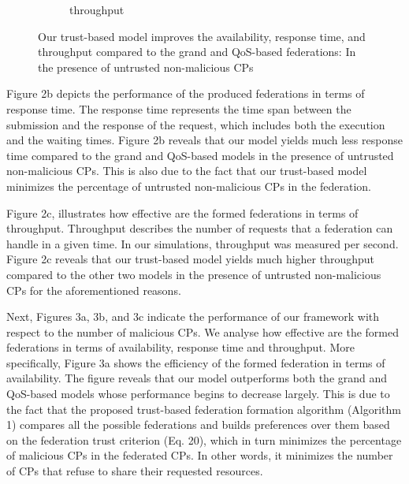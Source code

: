 \documentclass[preprint]{elsarticle}
\theoremstyle{definition}
\theoremstyle{remark}
\theoremstyle{property}
\begin{document}
\begin{figure}[!ht]
\begin{subfigure}{\textwidth}
\caption{throughput}
\end{subfigure}
\qquad\qquad
\caption{Our trust-based model improves the availability, response time, and throughput compared to the grand and QoS-based federations: In the presence of untrusted non-malicious CPs}
\end{figure}


Figure 2b depicts the performance of the produced federations
in terms of response time. The response time represents
the time span between the submission and the response of
the request, which includes both the execution and the waiting
times. Figure 2b reveals that our model yields much less
response time compared to the grand and QoS-based
models in the presence of untrusted non-malicious
CPs. This is also due to the fact that our trust-based model
minimizes the percentage of untrusted non-malicious CPs
in the federation.

Figure 2c, illustrates how effective are the formed federations
in terms of throughput. Throughput describes the number
of requests that a federation can handle in a given time. In
our simulations, throughput was measured per second.
Figure 2c reveals that our trust-based model yields much
higher throughput compared to the other two models in
the presence of untrusted non-malicious CPs for the aforementioned reasons.

Next, Figures 3a, 3b, and 3c indicate the performance of our framework with respect to the number of malicious
CPs. We analyse how effective are the formed federations
in terms of availability, response time and throughput.
More specifically, Figure 3a shows the efficiency of the
formed federation in terms of availability. The figure
reveals that our model outperforms both the grand
and QoS-based models whose performance begins to
decrease largely. This is due to the fact that the proposed trust-based federation formation algorithm (Algorithm 1) compares all the possible federations
and builds preferences over them based on the federation trust criterion (Eq. 20), which in turn
minimizes the percentage of malicious CPs
in the federated CPs. In other words, it minimizes
the number of CPs that refuse to share their requested resources.
\end{document}
